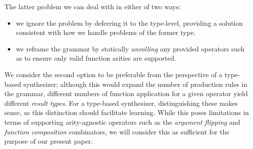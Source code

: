 \documentclass{article} %
\begin{document}
The latter problem we can deal with in either of two ways:
\begin{itemize}
    \item we ignore the problem by deferring it to the type-level,
    providing a solution consistent with how we handle problems of the former type.
    \item we reframe the grammar by statically \emph{unrolling} any provided operators such as to ensure only valid function arities are supported.
\end{itemize}

We consider the second option to be preferable from the perspective of a type-based synthesizer;
although this would expand the number of production rules in the grammar,
different numbers of function application for a given operator yield different \emph{result types}.
For a type-based synthesizer, distinguishing these makes sense,
as this distinction should facilitate learning.%
    While this poses limitations in terms of supporting arity-agnostic operators
    such as the \emph{argument flipping} and \emph{function composition} combinators,
    we will consider this as sufficient for the purpose of our present paper.
\end{document}
